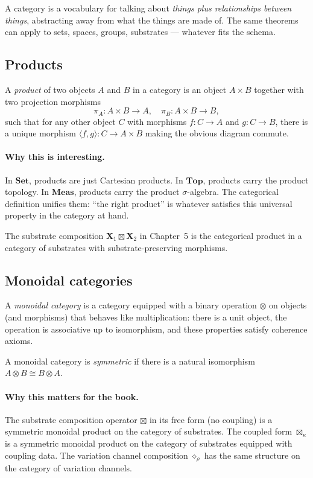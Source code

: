 A category is a vocabulary for talking about \emph{things plus
relationships between things}, abstracting away from what the things
are made of. The same theorems can apply to sets, spaces, groups,
substrates --- whatever fits the schema.

\subsection*{Products}

A \emph{product} of two objects $A$ and $B$ in a category is an
object $A \times B$ together with two projection morphisms
\[
  \pi_A : A \times B \to A, \quad \pi_B : A \times B \to B,
\]
such that for any other object $C$ with morphisms $f : C \to A$ and
$g : C \to B$, there is a unique morphism $\langle f, g\rangle : C
\to A \times B$ making the obvious diagram commute.

\paragraph{Why this is interesting.} In $\mathbf{Set}$, products
are just Cartesian products. In $\mathbf{Top}$, products carry the
product topology. In $\mathbf{Meas}$, products carry the product
$\sigma$-algebra. The categorical definition unifies them: ``the
right product'' is whatever satisfies this universal property in
the category at hand.

The substrate composition $\mathbf{X}_1 \boxtimes \mathbf{X}_2$ in
Chapter~5 is the categorical product in a category of substrates
with substrate-preserving morphisms.

\subsection*{Monoidal categories}

A \emph{monoidal category} is a category equipped with a binary
operation $\otimes$ on objects (and morphisms) that behaves like
multiplication: there is a unit object, the operation is
associative up to isomorphism, and these properties satisfy
coherence axioms.

A monoidal category is \emph{symmetric} if there is a natural
isomorphism $A \otimes B \cong B \otimes A$.

\paragraph{Why this matters for the book.} The substrate
composition operator $\boxtimes$ in its free form (no coupling) is
a symmetric monoidal product on the category of substrates. The
coupled form $\boxtimes_\kappa$ is a symmetric monoidal product on
the category of substrates equipped with coupling data. The
variation channel composition $\diamond_\rho$ has the same
structure on the category of variation channels.

